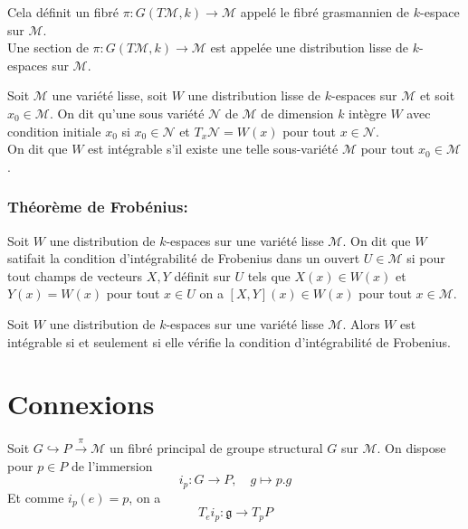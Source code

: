 \begin{defi}
Cela définit un fibré $\pi : G(T\mathcal{M}, k) \to \mathcal{M}$ appelé le fibré grasmannien de $k$-espace sur $\mathcal{M}$. \\
Une section de $\pi : G(T\mathcal{M}, k) \to \mathcal{M}$ est appelée une distribution lisse de $k$-espaces sur $\mathcal{M}$.
\end{defi}

\begin{defi}
Soit $\mathcal{M}$ une variété lisse, soit $W$ une distribution lisse de $k$-espaces sur $\mathcal{M}$ et soit $x_0\in \mathcal{M}$. On dit qu'une sous variété $\mathcal{N}$ de $\mathcal{M}$ de dimension $k$ intègre $W$ avec condition initiale $x_0$ si $x_0 \in \mathcal{N}$ et $T_x\mathcal{N} = W(x)$ pour tout $x\in \mathcal{N}$. \\
On dit que $W$ est intégrable s'il existe une telle sous-variété $\mathcal{M}$ pour tout $x_0\in \mathcal{M}$.
\end{defi}

\subsubsection{Théorème de Frobénius:}

\begin{defi}
Soit $W$ une distribution de $k$-espaces sur une variété lisse $\mathcal{M}$. On dit que $W$ satifait la condition d'intégrabilité de Frobenius dans un ouvert $U\in \mathcal{M}$ si pour tout champs de vecteurs $X,Y$ définit sur $U$ tels que $X(x) \in W(x)$ et $Y(x) = W(x)$ pour tout $x\in U$ on a $[X, Y](x) \in W(x)$ pour tout $x\in \mathcal{M}$.
\end{defi}

\begin{pro}
Soit $W$ une distribution de $k$-espaces sur une variété lisse $\mathcal{M}$. Alors $W$ est intégrable si et seulement si elle vérifie la condition d'intégrabilité de Frobenius.
\end{pro}

\newpage
\section{Connexions}

Soit $G \hookrightarrow P \overset{\pi}{\to} \mathcal{M}$ un fibré principal de groupe structural $G$ sur $\mathcal{M}$. On dispose pour $p\in P$ de l'immersion
$$i_p : G \to P, \quad g \mapsto p.g$$
Et comme $i_p(e) = p$, on a
$$T_e i_p: \mathfrak{g} \to T_pP$$

